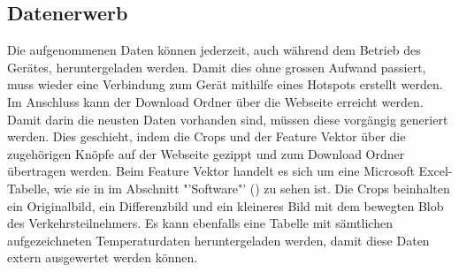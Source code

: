\subsection{Datenerwerb}
Die aufgenommenen Daten können jederzeit, auch während dem Betrieb des Gerätes, heruntergeladen werden. Damit dies ohne grossen Aufwand passiert, muss wieder eine Verbindung zum Gerät mithilfe eines Hotspots erstellt werden. Im Anschluss kann der Download Ordner über die Webseite erreicht werden. Damit darin die neusten Daten vorhanden sind, müssen diese vorgängig generiert werden. Dies geschieht, indem die Crops und der Feature Vektor über die zugehörigen Knöpfe auf der Webseite gezippt und zum Download Ordner übertragen werden. Beim Feature Vektor handelt es sich um eine Microsoft Excel-Tabelle, wie sie in im Abschnitt "'Software"' () zu sehen ist. Die Crops beinhalten ein Originalbild, ein Differenzbild und ein kleineres Bild mit dem bewegten Blob des Verkehrsteilnehmers. Es kann ebenfalls eine Tabelle mit sämtlichen aufgezeichneten Temperaturdaten heruntergeladen werden, damit diese Daten extern ausgewertet werden können.